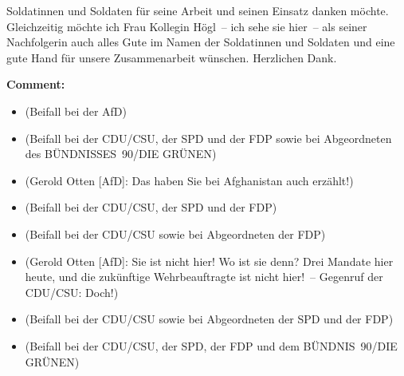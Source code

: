 \documentclass{article}
\begin{document}
Soldatinnen und Soldaten für seine Arbeit und seinen Einsatz danken möchte. Gleichzeitig möchte ich Frau Kollegin Högl – ich sehe sie hier – als seiner Nachfolgerin auch alles Gute im Namen der Soldatinnen und Soldaten und eine gute Hand für unsere Zusammenarbeit wünschen.  Herzlichen Dank.  

\noindent\textbf{Comment:}
\begin{itemize}
    \setlength\itemsep{-3pt}
    \item (Beifall bei der AfD)
    \setlength\itemsep{-3pt}
    \item (Beifall bei der CDU/CSU, der SPD und der FDP sowie bei Abgeordneten des BÜNDNISSES 90/DIE GRÜNEN)
    \setlength\itemsep{-3pt}
    \item (Gerold Otten [AfD]: Das haben Sie bei Afghanistan auch erzählt!)
    \setlength\itemsep{-3pt}
    \item (Beifall bei der CDU/CSU, der SPD und der FDP)
    \setlength\itemsep{-3pt}
    \item (Beifall bei der CDU/CSU sowie bei Abgeordneten der FDP)
    \setlength\itemsep{-3pt}
    \item (Gerold Otten [AfD]: Sie ist nicht hier! Wo ist sie denn? Drei Mandate hier heute, und die zukünftige Wehrbeauftragte ist nicht hier! – Gegenruf der CDU/CSU: Doch!)
    \setlength\itemsep{-3pt}
    \item (Beifall bei der CDU/CSU sowie bei Abgeordneten der SPD und der FDP)
    \setlength\itemsep{-3pt}
    \item (Beifall bei der CDU/CSU, der SPD, der FDP und dem BÜNDNIS 90/DIE GRÜNEN)
\end{itemize}
\end{document}
